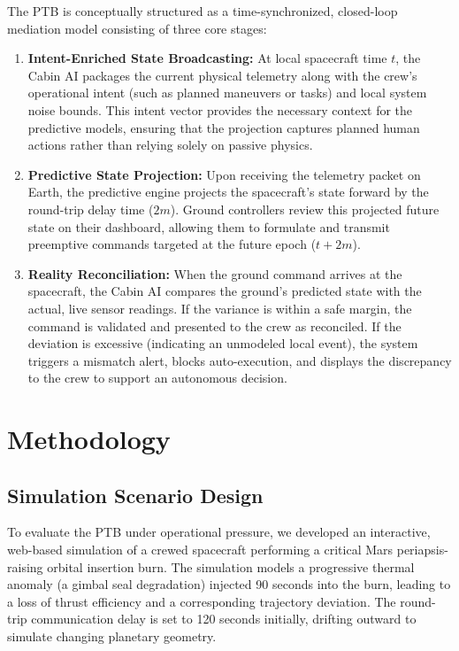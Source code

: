 \documentclass[12pt,a4paper]{article}
\begin{document}
The PTB is conceptually structured as a time-synchronized, closed-loop mediation model consisting of three core stages:

\begin{enumerate}
    \item \textbf{Intent-Enriched State Broadcasting:} At local spacecraft time \(t\), the Cabin AI packages the current physical telemetry along with the crew's operational intent (such as planned maneuvers or tasks) and local system noise bounds. This intent vector provides the necessary context for the predictive models, ensuring that the projection captures planned human actions rather than relying solely on passive physics.
    \item \textbf{Predictive State Projection:} Upon receiving the telemetry packet on Earth, the predictive engine projects the spacecraft's state forward by the round-trip delay time (\(2m\)). Ground controllers review this projected future state on their dashboard, allowing them to formulate and transmit preemptive commands targeted at the future epoch (\(t + 2m\)).
    \item \textbf{Reality Reconciliation:} When the ground command arrives at the spacecraft, the Cabin AI compares the ground's predicted state with the actual, live sensor readings. If the variance is within a safe margin, the command is validated and presented to the crew as reconciled. If the deviation is excessive (indicating an unmodeled local event), the system triggers a mismatch alert, blocks auto-execution, and displays the discrepancy to the crew to support an autonomous decision.
\end{enumerate}

\section{Methodology}

\subsection{Simulation Scenario Design}
To evaluate the PTB under operational pressure, we developed an interactive, web-based simulation of a crewed spacecraft performing a critical Mars periapsis-raising orbital insertion burn. The simulation models a progressive thermal anomaly (a gimbal seal degradation) injected 90 seconds into the burn, leading to a loss of thrust efficiency and a corresponding trajectory deviation. The round-trip communication delay is set to 120 seconds initially, drifting outward to simulate changing planetary geometry.
\end{document}
